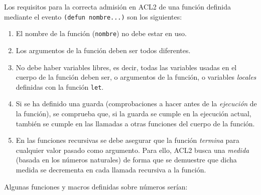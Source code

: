 \documentclass[a4paper,10pt]{article}
\begin{document}
\par\vspace{10pt}

Los requisitos para la correcta admisión en ACL2 de una función definida mediante el evento \texttt{(defun nombre...)} son los siguientes:

\par\vspace{10pt}

\begin{enumerate}
	\item El nombre de la función (\texttt{nombre}) no debe estar en uso.
	\item Los argumentos de la función deben ser todos diferentes.
	\item No debe haber variables libres, es decir, todas las variables usadas en el cuerpo de la función deben ser, o argumentos de la función, o variables \emph{locales} definidas con la función \texttt{let}.
	\item Si se ha definido una guarda (comprobaciones a hacer antes de la \emph{ejecución} de la función), se comprueba que, si la guarda se cumple en la ejecución actual, también se cumple en las llamadas a otras funciones del cuerpo de la función.
	\item En las funciones recursivas se debe asegurar que la función \emph{termina} para cualquier valor pasado como argumento. Para ello, ACL2 busca una \emph{medida} (basada en los números naturales) de forma que se demuestre que dicha medida se decrementa en cada llamada recursiva a la función.
\end{enumerate}

\par\vspace{10pt}

Algunas funciones y macros definidas sobre números serían:

\par\vspace{10pt}
\end{document}
